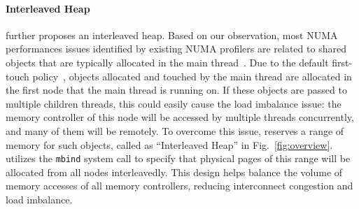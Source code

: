 
\paragraph{Interleaved Heap} \NA{} further proposes an interleaved heap. Based on our observation, most NUMA performances issues identified by existing NUMA profilers are related to shared objects that are typically allocated in the main thread~\cite{XULIU, MemProf}. Due to the default first-touch policy~\cite{lameter2013numa, diener2015locality}, objects allocated and touched by the main thread are allocated in the first node that the main thread is running on. If these objects are passed to multiple children threads, this could easily cause the load imbalance issue: the memory controller of this node will be accessed by multiple threads concurrently, and many of them will be remotely. To overcome this issue, \NA{} reserves a range of memory for such objects, called as ``Interleaved Heap'' in Fig.~\ref{fig:overview}. \NA{} utilizes the \texttt{mbind} system call to specify that physical pages of this range will be allocated from all nodes interleavedly. This design helps balance the volume of memory accesses of all memory controllers, reducing interconnect congestion and load imbalance. 

